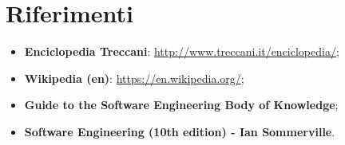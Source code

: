 \section{Riferimenti}

\begin{itemize}
\item \textbf{Enciclopedia Treccani}: \url{http://www.treccani.it/enciclopedia/};
\item \textbf{Wikipedia (en)}: \url{https://en.wikipedia.org/};
\item \textbf{Guide to the Software Engineering Body of Knowledge};
\item \textbf{Software Engineering (10th edition) - Ian Sommerville}.
\end{itemize}

\clearpage